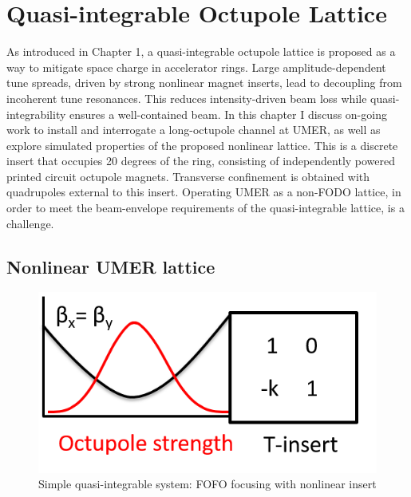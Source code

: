 

\makeatletter
\def\env@matrix{\hskip -\arraycolsep
  \let\@ifnextchar\new@ifnextchar
  \linespread{1}\selectfont
  \renewcommand{\arraystretch}{0.5}%
  \array{*\c@MaxMatrixCols c}}
\makeatother


\renewcommand{\thechapter}{7}

\chapter{Quasi-integrable Octupole Lattice}

As introduced in Chapter 1, a quasi-integrable octupole lattice is proposed as a way to mitigate space charge in accelerator rings. Large amplitude-dependent tune spreads, driven by strong nonlinear magnet inserts, lead to decoupling from incoherent tune resonances. This reduces intensity-driven beam loss while quasi-integrability ensures a well-contained beam. In this chapter I discuss on-going work to install and interrogate a long-octupole channel at UMER, as well as explore simulated properties of the proposed nonlinear lattice. This is a discrete insert that occupies 20 degrees of the ring, consisting of independently powered printed circuit octupole magnets. Transverse confinement is obtained with quadrupoles external to this insert. Operating UMER as a non-FODO lattice, in order to meet the beam-envelope requirements of the quasi-integrable lattice, is a challenge. 






\section{Nonlinear UMER lattice}

\begin{figure}
\centering
\includegraphics[width=.5\textwidth]{gen.figures/toy_model.png}
\caption{Simple quasi-integrable system: FOFO focusing with nonlinear insert }
\label{fig:toymodel}
\end{figure}

